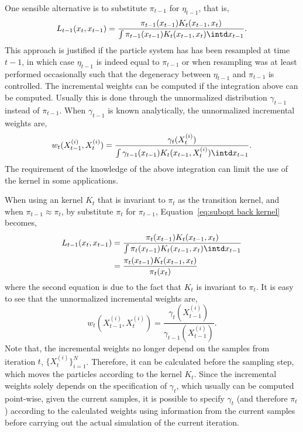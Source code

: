 One sensible alternative is to substitute $\pi_{t-1}$ for $\eta_{t-1}$, that is,
\begin{equation}
  L_{t-1}(x_t,x_{t-1}) =
  \frac{\pi_{t-1}(x_{t-1})K_t(x_{t-1},x_t)}
  {\int \pi_{t-1}(x_{t-1})K_t(x_{t-1},x_t)\intd x_{t-1}}.
  \label{eq:subopt back kernel}
\end{equation}
This approach is justified if the particle system has has been resampled at time $t-1$, in which case $\eta_{t-1}$ is indeed equal to $\pi_{t-1}$ or when resampling was at least performed occasionally such that the degeneracy between $\eta_{t-1}$ and $\pi_{t-1}$ is controlled. The incremental weights can be computed if the integration above can be computed. Usually this is done through the unnormalized distribution $\gamma_{t-1}$ instead of $\pi_{t-1}$. When $\gamma_{t-1}$ is known analytically, the unnormalized incremental weights are,
\begin{equation}
  w_t(X_{t-1}^{(i)},X_t^{(i)}) =
  \frac{\gamma_t(X_t^{(i)})}
  {\int\gamma_{t-1}(x_{t-1})K_t(x_{t-1},X_t^{(i)})\intd x_{t-1}}.
  \label{eq:inc weight subopt}
\end{equation}
The requirement of the knowledge of the above integration can limit the use of the kernel in some applications.

When using an \mcmc kernel $K_t$ that is invariant to $\pi_t$ as the transition kernel, and when $\pi_{t-1}\approx\pi_t$, by substitute $\pi_t$ for $\pi_{t-1}$, Equation~\eqref{eq:subopt back kernel} becomes,
\begin{align}
  L_{t-1}(x_t,x_{t-1})
  &= \frac{\pi_t(x_{t-1})K_t(x_{t-1},x_t)}
  {\int \pi_t(x_{t-1})K_t(x_{t-1},x_t)\intd x_{t-1}} \notag\\
  &= \frac{\pi_t(x_{t-1})K_t(x_{t-1},x_t)}{\pi_t(x_t)}
  \label{eq:subopt back kernel mcmc}
\end{align}
where the second equation is due to the fact that $K_t$ is invariant to $\pi_t$. It is easy to see that the unnormalized incremental weights are,
\begin{equation}
  w_t(X_{t-1}^{(i)},X_t^{(i)}) =
  \frac{\gamma_t(X_{t-1}^{(i)})}{\gamma_{t-1}(X_{t-1}^{(i)})}.
  \label{eq:inc weight subopt mcmc}
\end{equation}
Note that, the incremental weights no longer depend on the samples from iteration $t$, $\{X_t^{(i)}\}_{i=1}^N$. Therefore, it can be calculated before the sampling step, which moves the particles according to the kernel $K_t$. Since the incremental weights solely depends on the specification of $\gamma_t$, which usually can be computed point-wise, given the current samples, it is possible to specify $\gamma_t$ (and therefore $\pi_t$) according to the calculated weights using information from the current samples before carrying out the actual simulation of the current iteration.

